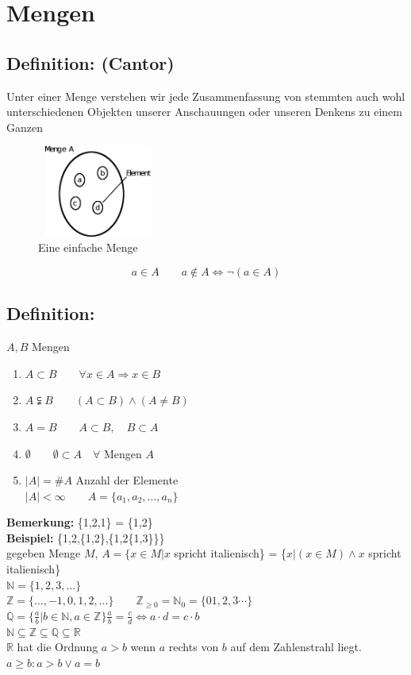 \section{Mengen}
\subsection{Definition: (Cantor)}
Unter einer Menge verstehen wir jede Zusammenfassung von stemmten auch wohl unterschiedenen Objekten unserer Anschauungen oder unseren Denkens zu einem Ganzen\\

\begin{figure} [H]
\centering 
\includegraphics[width=4cm, height=3cm]{mainmatter/chapter0/pics/menge.png}
\caption{Eine einfache Menge} 
\end{figure}
\begin{equation*}
a \in A \qquad a \notin A \Leftrightarrow \neg (a \in A)
\end{equation*}
%
\subsection{Definition:}
$A, B$ Mengen 
\begin{enumerate}
\item $A \subset B \qquad \forall x \in A \Rightarrow x \in B$
\item $A \subsetneqq B \qquad (A \subset B) \wedge (A \neq B)$
\item $A = B \qquad A\subset B, \quad B\subset A$
\item $\emptyset \qquad \emptyset \subset A \quad \forall$ Mengen $A$
\item $|A| = \#A$ \qquad Anzahl der Elemente\\
 $|A| < \infty \qquad A=\{a_{1}, a_{2}, \dotsc, a_{n}\}$
\end{enumerate}
%
\textbf{Bemerkung:} \{1,2,1\} = \{1,2\}\\
\textbf{Beispiel:} \{1,2,\{1,2\},\{1,2\{1,3\}\}\}\\
gegeben Menge $M$, \quad $A=\{x \in M|x$ spricht italienisch\} = \{$x|(x \in M) \wedge x$ spricht italienisch\}\\
$\mathbb{N}=\{1,2,3, \dotsc \}$\\
$\mathbb{Z}=\{\dotsc, -1, 0, 1,2,\dotsc \} \qquad \mathbb{Z}_{\geq 0}=\mathbb{N}_{0}=\{01,2,3\cdots \}$\\
$\mathbb{Q}=\{ \frac{a}{b}|b \in \mathbb{N}, a \in \mathbb{Z}\} \frac{a}{b}=\frac{c}{d} \Leftrightarrow a \cdot d = c \cdot b$\\
$\mathbb{N}\subseteq\mathbb{Z}\subseteq\mathbb{Q}\subseteq\mathbb{R}$\\
$\mathbb{R}$ hat die Ordnung $a>b$ wenn $a$ rechts von $b$ auf dem Zahlenstrahl liegt.\\
$ a \geq b : a >b \vee a=b$\\
%
%
%
